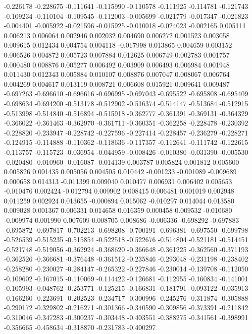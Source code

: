 -0.226178
-0.228675
-0.111641
-0.115990
-0.110578
-0.111925
-0.114781
-0.121743
-0.109234
-0.110104
-0.109545
-0.112003
-0.005699
-0.021779
-0.017347
-0.021823
-0.004401
-0.005922
-0.021596
-0.015925
-0.010018
-0.024023
-0.002165
0.005111
0.006213
0.006064
0.002946
0.002032
0.004690
0.006272
0.001523
0.003058
0.009615
0.012434
0.004754
0.004118
-0.017998
0.013865
0.004659
0.003152
0.006526
0.004872
0.005723
0.007884
0.012625
0.006749
0.002783
0.001757
0.000480
0.008876
0.005277
0.006492
0.003909
0.006493
0.006984
0.001948
0.011430
0.012343
0.005884
0.010107
0.008876
0.007047
0.008067
0.006764
0.004269
0.004617
0.013119
0.008721
0.006608
0.015921
0.009641
0.009487
-0.697263
-0.696610
-0.696616
-0.696995
-0.697043
-0.695522
-0.695808
-0.695409
-0.698634
-0.694200
-0.513178
-0.512902
-0.516374
-0.514147
-0.513684
-0.512915
-0.513998
-0.514840
-0.516894
-0.515918
-0.362777
-0.361391
-0.369131
-0.364329
-0.366022
-0.361463
-0.362970
-0.361711
-0.360351
-0.362258
-0.228478
-0.230392
-0.228820
-0.233947
-0.228742
-0.227596
-0.227414
-0.228457
-0.236279
-0.228271
-0.124915
-0.114888
-0.110362
-0.118636
-0.117357
-0.112641
-0.111742
-0.122615
-0.113757
-0.115723
-0.036954
-0.044959
-0.008426
-0.010380
-0.031390
-0.005530
-0.020480
-0.010960
-0.016087
-0.014139
0.003787
0.005824
0.001812
0.005600
0.005826
0.001435
0.005056
0.004505
0.010442
-0.001233
-0.001089
-0.009689
0.000658
0.014313
-0.011399
0.009040
0.010477
0.006931
0.006402
0.005653
-0.010476
0.002424
-0.012794
0.009902
0.008415
0.006481
0.001019
0.002948
0.011259
0.002924
0.013655
-0.000894
0.015062
-0.010297
0.014044
0.013580
0.009028
0.001367
0.006331
0.014658
0.016359
0.000458
0.009532
-0.010680
-0.009974
0.001990
0.007609
0.008705
0.008686
-0.006336
-0.698292
-0.697883
-0.695872
-0.697817
-0.702213
-0.698208
-0.700191
-0.696381
-0.697550
-0.699798
-0.526539
-0.515235
-0.515854
-0.522518
-0.522676
-0.514804
-0.521181
-0.514451
-0.521748
-0.519056
-0.362924
-0.368620
-0.366648
-0.361225
-0.362560
-0.371193
-0.362526
-0.366681
-0.376448
-0.361512
-0.235846
-0.293048
-0.231198
-0.238402
-0.258280
-0.230027
-0.284147
-0.265322
-0.227846
-0.230014
-0.139708
-0.112050
-0.109602
-0.167015
-0.110069
-0.114422
-0.126681
-0.112955
-0.160834
-0.141001
-0.105993
-0.048762
-0.253771
-0.125215
-0.166831
-0.181791
-0.093122
-0.035913
-0.166260
-0.223691
-0.202523
-0.234717
-0.300996
-0.245276
-0.311874
-0.305888
-0.290172
-0.329802
-0.216271
-0.301366
-0.340590
-0.309856
-0.373391
-0.211842
-0.310046
-0.347283
-0.300237
-0.303448
-0.403551
-0.388275
-0.341561
-0.398991
-0.356665
-0.458634
-0.318870
-0.231783
-0.400297
